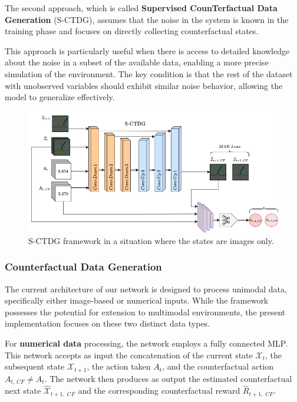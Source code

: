 The second approach, which is called \textbf{Supervised CounTerfactual Data Generation} (S-CTDG),
assumes that the noise in the system is known
in the training phase and focuses on directly collecting
counterfactual states.

This approach is particularly useful when there is access to detailed
knowledge about the noise in a subset of the available data,
enabling a more precise simulation of the environment.
The key condition is that the rest of the dataset with unobserved
variables should exhibit similar noise behavior, allowing the model
to generalize effectively.

\begin{figure}[ht]
    \centering
    \includegraphics[width=\textwidth]{figures/ch4/2.sctdg.png}
    \caption{S-CTDG framework in a situation where the states are
    images only.}
    \label{fig:sctdg}
\end{figure}

\subsubsection{Counterfactual Data Generation}

The current architecture of our network is designed to process unimodal data,
specifically either image-based or numerical inputs.
While the framework possesses the potential for extension
to multimodal environments, the present implementation focuses
on these two distinct data types.

For \textbf{numerical data} processing, the network employs a fully connected MLP.
This network accepts as input the concatenation of the current state
$\mathcal{X}_{t}$, the subsequent state $\mathcal{X}_{t+1}$,
the action taken $A_t$, and the counterfactual action $A_{t,\, CF} \neq A_t$.
The network then produces as output the estimated counterfactual next state
$\hat{\mathcal{X}}_{t+1,\; CF}$ and the corresponding counterfactual
reward $\hat{R}_{t+1,\; CF}$.

